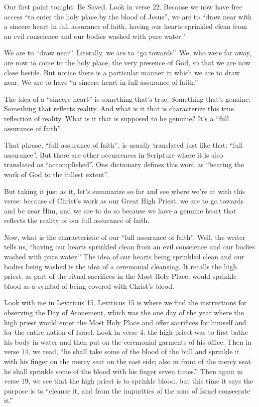\documentclass[letterpaper, 12pt]{article}
\begin{document}
    Our first point tonight: Be Saved. Look in verse 22. Because we now
    have free access ``to enter the holy place by the blood of Jesus'',
    we are to ``draw near with a sincere heart in full assurance of
    faith, having our hearts sprinkled clean from an evil conscience and
    our bodies washed with pure water.''

    We are to ``draw near''. Literally, we are to ``go towards''. We,
    who were far away, are now to come to the holy place, the very
    presence of God, so that we are now close beside. But notice there
    is a particular manner in which we are to draw near. We are to have
    ``a sincere heart in full assurance of faith.'' 

    The idea of a ``sincere heart'' is something that's true.
    Something that's genuine. Something that reflects reality. And what
    is it that is characterize this true reflection of reality. What is
    it that is supposed to be genuine? It's a ``full assurance of
    faith''. 

    That phrase, ``full assurance of faith'', is usually translated just
    like that: ``full assurance''. But there are other occurrences in
    Scripture where it is also translated as ``accomplished''. One
    dictionary defines this word as ``bearing the work of God to the
    fullest extent''.

    But taking it just as it, let's summarize so far and see where we're
    at with this verse: because of Christ's work as our Great High
    Priest, we are to go towards and be near Him, and we are to do so
    because we have a genuine heart that reflects the reality of our
    full assurance of faith.

    Now, what is the characteristic of our ``full assurance of faith''.
    Well, the writer tells us, ``having our hearts sprinkled clean from
    an evil conscience and our bodies washed with pure water.'' The idea
    of our hearts being sprinkled clean and our bodies being washed is
    the idea of a ceremonial cleansing. It recalls the high priest, as
    part of the ritual sacrifices in the Most Holy Place, would sprinkle
    blood as a symbol of being covered with Christ's blood. 

    Look with me in Leviticus 15. Leviticus 15 is where we find the
    instructions for observing the Day of Atonement, which was the one
    day of the year where the high priest would enter the Most Holy
    Place and offer sacrifices for himself and for the entire nation of
    Israel. Look in verse 4: the high priest was to first bathe his body
    in water and then put on the ceremonial garments of his office. Then
    in verse 14, we read, ``he shall take some of the blood of the bull
    and sprinkle it with his finger on the mercy seat on the east side;
    also in front of the mercy seat he shall sprinkle some of the blood
    with his finger seven times.'' Then again in verse 19, we see that
    the high priest is to sprinkle blood, but this time it says the
    purpose is to ``cleanse it, and from the impurities of the sons of
    Israel consecrate it.''
\end{document}

